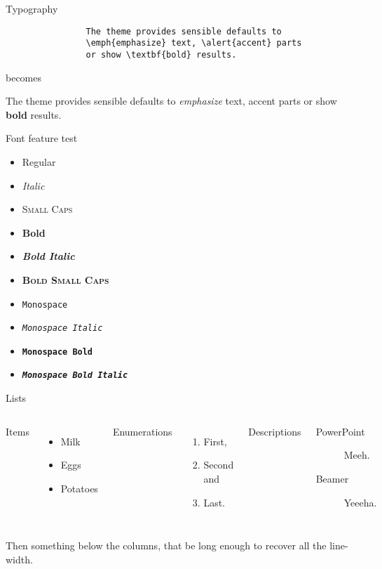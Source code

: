 		\begin{frame}[fragile]{Typography}
			\begin{verbatim}
				The theme provides sensible defaults to
				\emph{emphasize} text, \alert{accent} parts
				or show \textbf{bold} results.
			\end{verbatim}
			
			\begin{center}becomes\end{center}
			
			The theme provides sensible defaults to \emph{emphasize} text,
			\alert{accent} parts or show \textbf{bold} results.
		\end{frame}
			
		\begin{frame}{Font feature test}
			\begin{itemize}
				\item Regular
				\item \textit{Italic}
				\item \textsc{Small Caps}
				\item \textbf{Bold}
				\item \textbf{\textit{Bold Italic}}
				\item \textbf{\textsc{Bold Small Caps}}
				\item \texttt{Monospace}
				\item \texttt{\textit{Monospace Italic}}
				\item \texttt{\textbf{Monospace Bold}}
				\item \texttt{\textbf{\textit{Monospace Bold Italic}}}
			\end{itemize}
		\end{frame}
			
		\begin{frame}{Lists}
			\begin{columns}[T,onlytextwidth]
					Items
					\begin{itemize}
					  \item Milk \item Eggs \item Potatoes
					\end{itemize}
				
					Enumerations
					\begin{enumerate}
					  \item First, \item Second and \item Last.
					\end{enumerate}
				
					Descriptions
					\begin{description}
					  \item[PowerPoint] Meeh. \item[Beamer] Yeeeha.
					\end{description}
			\end{columns}
			
			Then something below the columns, that be long enough to recover all the line-width.
		\end{frame}
		
